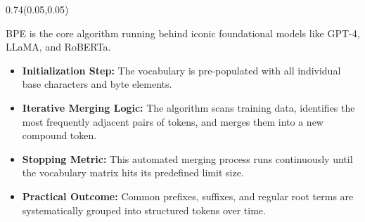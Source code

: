 \documentclass[aspectratio=169]{beamer}
\begin{document}
	\begin{frame}{}
		\setlength{\TPHorizModule}{\textwidth}
		\setlength{\TPVertModule}{\textwidth}
		\begin{textblock}{0.74}(0.05,0.05)
			\bfseries\large{}
		\end{textblock}
		
		\vspace{2em}
		BPE is the core algorithm running behind iconic foundational models like GPT-4, LLaMA, and RoBERTa.
		\vspace{1em}
		\begin{itemize}
			\item \textbf{Initialization Step:} The vocabulary is pre-populated with all individual base characters and byte elements.
			\item \textbf{Iterative Merging Logic:} The algorithm scans training data, identifies the most frequently adjacent pairs of tokens, and merges them into a new compound token.
			\item \textbf{Stopping Metric:} This automated merging process runs continuously until the vocabulary matrix hits its predefined limit size.
			\item \textbf{Practical Outcome:} Common prefixes, suffixes, and regular root terms are systematically grouped into structured tokens over time.
		\end{itemize}
	\end{frame}
	
\end{document}
